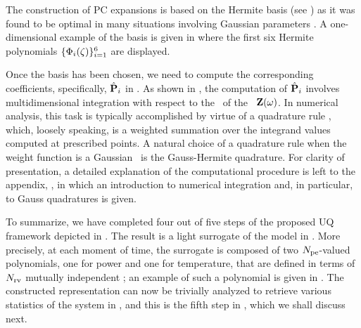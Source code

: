 The construction of PC expansions is based on the Hermite basis (see ) as it was found to be optimal in many situations involving Gaussian parameters \cite{xiu2002}. A one-dimensional example of the basis is given in  where the first six Hermite polynomials $\{ \Phi_i(\zeta) \}_{i = 1}^6$ are displayed.

Once the basis has been chosen, we need to compute the corresponding coefficients, specifically, $\hat{\mathbf{P}}_i$ in . As shown in , the computation of $\hat{\mathbf{P}}_i$ involves multidimensional integration with respect to the \pdf\ of the \rvs\ $\mathbf{Z}(\omega)$. In numerical analysis, this task is typically accomplished by virtue of a quadrature rule \cite{press2007}, which, loosely speaking, is a weighted summation over the integrand values computed at prescribed points. A natural choice of a quadrature rule when the weight function is a Gaussian \pdf\ is the Gauss-Hermite quadrature. For clarity of presentation, a detailed explanation of the computational procedure is left to the appendix, , in which an introduction to numerical integration and, in particular, to Gauss quadratures is given.

To summarize, we have completed four out of five steps of the proposed UQ framework depicted in . The result is a light surrogate of the model in . More precisely, at each moment of time, the surrogate is composed of two ${N_\text{pe}}$-valued polynomials, one for power and one for temperature, that are defined in terms of ${N_\text{rv}}$ mutually independent \rvs; an example of such a polynomial is given in . The constructed representation can now be trivially analyzed to retrieve various statistics of the system in , and this is the fifth step in , which we shall discuss next.
